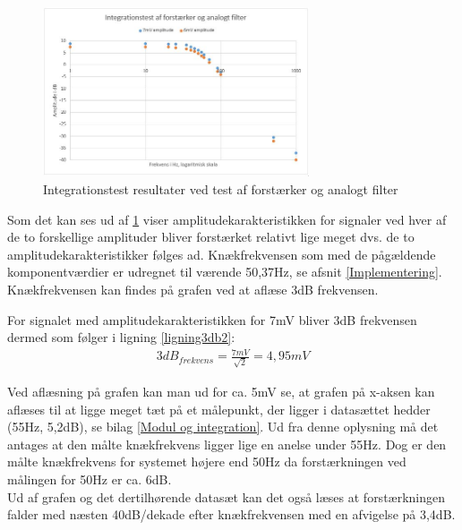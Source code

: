 \begin{figure}[H]
	\centering
	\includegraphics[width=0.7\textwidth]{Figurer/Hardware/IntegrationstestForstaerkerFilter2}
	\caption{Integrationstest resultater ved test af forstærker og analogt filter}
	\label{fig:ForstaerkerFilterGraf}
\end{figure}

Som det kan ses ud af \ref{fig:ForstaerkerFilterGraf} viser amplitudekarakteristikken for signaler ved hver af de to forskellige amplituder bliver forstærket relativt lige meget dvs. de to amplitudekarakteristikker følges ad.
Knækfrekvensen som med de pågældende komponentværdier er udregnet til værende 50,37Hz, se afsnit \ref{Implementering}. Knækfrekvensen kan findes på grafen ved at aflæse 3dB frekvensen.

For signalet med amplitudekarakteristikken for 7mV bliver 3dB frekvensen dermed som følger i ligning \ref{ligning3db2}:\\
\begin{align}
	3dB_{frekvens}=\frac{7mV}{\sqrt{2}}=4,95mV
	\label{ligning3db2}
\end{align}


Ved aflæsning på grafen kan man ud for ca. 5mV se, at grafen på x-aksen kan aflæses til at ligge meget tæt på et målepunkt, der ligger i datasættet hedder (55Hz, 5,2dB), se bilag \ref{Modul og integration}. Ud fra denne oplysning må det antages at den målte knækfrekvens ligger lige en anelse under 55Hz. Dog er den målte knækfrekvens for systemet højere end 50Hz da forstærkningen ved målingen for 50Hz er ca. 6dB.\\
Ud af grafen og det dertilhørende datasæt kan det også læses at forstærkningen falder med næsten 40dB/dekade efter knækfrekvensen med en afvigelse på 3,4dB.

